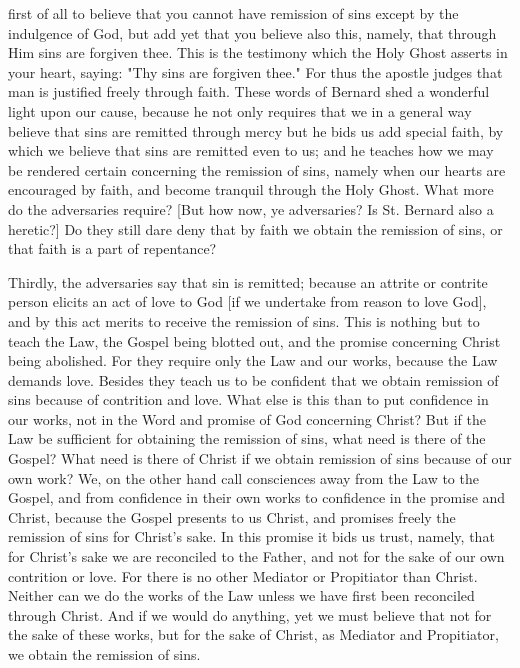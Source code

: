 first of all to believe that you cannot have remission of sins except
by the indulgence of God, but add yet that you believe also this,
namely, that through Him sins are forgiven thee.  This is the
testimony which the Holy Ghost asserts in your heart, saying: "Thy
sins are forgiven thee." For thus the apostle judges that man is
justified freely through faith.  These words of Bernard shed a
wonderful light upon our cause, because he not only requires that we
in a general way believe that sins are remitted through mercy but he
bids us add special faith, by which we believe that sins are remitted
even to us; and he teaches how we may be rendered certain concerning
the remission of sins, namely when our hearts are encouraged by faith,
and become tranquil through the Holy Ghost.  What more do the
adversaries require?  [But how now, ye adversaries?  Is St. Bernard
also a heretic?] Do they still dare deny that by faith we obtain the
remission of sins, or that faith is a part of repentance?

Thirdly, the adversaries say that sin is remitted; because an attrite
or contrite person elicits an act of love to God [if we undertake
from reason to love God], and by this act merits to receive the
remission of sins.  This is nothing but to teach the Law, the Gospel
being blotted out, and the promise concerning Christ being abolished.
For they require only the Law and our works, because the Law demands
love.  Besides they teach us to be confident that we obtain remission
of sins because of contrition and love.  What else is this than to
put confidence in our works, not in the Word and promise of God
concerning Christ?  But if the Law be sufficient for obtaining the
remission of sins, what need is there of the Gospel?  What need is
there of Christ if we obtain remission of sins because of our own
work?  We, on the other hand call consciences away from the Law to
the Gospel, and from confidence in their own works to confidence in
the promise and Christ, because the Gospel presents to us Christ, and
promises freely the remission of sins for Christ's sake.  In this
promise it bids us trust, namely, that for Christ's sake we are
reconciled to the Father, and not for the sake of our own contrition
or love.  For there is no other Mediator or Propitiator than Christ.
Neither can we do the works of the Law unless we have first been
reconciled through Christ.  And if we would do anything, yet we must
believe that not for the sake of these works, but for the sake of
Christ, as Mediator and Propitiator, we obtain the remission of sins.

